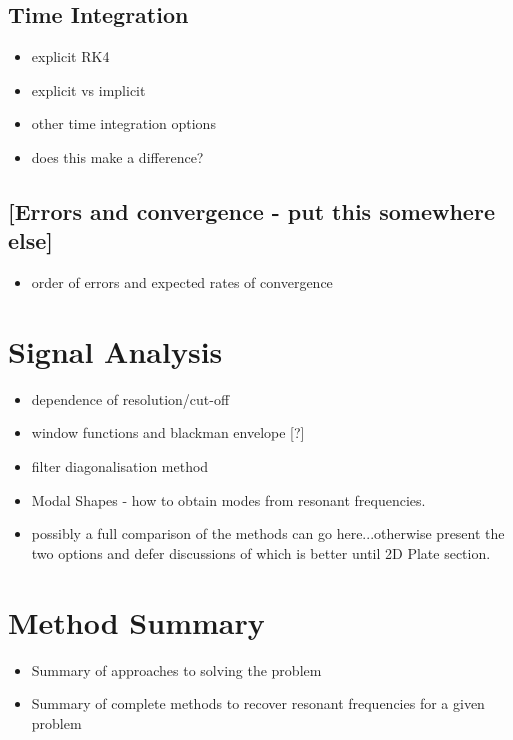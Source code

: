 \subsection{Time Integration}
\begin{itemize}
	\item explicit RK4
	\item explicit vs implicit
	\item other time integration options
	\item does this make a difference?
\end{itemize}
\subsection{[Errors and convergence - put this somewhere else]}
\begin{itemize}
  \item order of errors and expected rates of convergence
\end{itemize}
\section{Signal Analysis}
\begin{itemize}
  \item dependence of resolution/cut-off
	\item window functions and blackman envelope [?]
	\item filter diagonalisation method
	\item Modal Shapes - how to obtain modes from resonant frequencies.
  \item possibly a full comparison of the methods can go here...otherwise present the two options and defer discussions of which is better until 2D Plate section.
\end{itemize}
\section{Method Summary}
\begin{itemize}
  \item Summary of approaches to solving the problem
	\item Summary of complete methods to recover resonant frequencies for a given problem
\end{itemize}